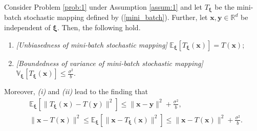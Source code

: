 \documentclass[10pt,a4paper]{amsart}
\begin{document}
\begin{proposition}\label{prop:1}
Consider Problem \ref{prob:1} under Assumption \ref{assum:1} and let $T_{\bm{\xi}}$ be the mini-batch stochastic mapping defined by (\ref{mini_batch}). Further, let $\bm{x}, \bm{y} \in \mathbb{R}^d$ be independent of $\bm{\xi}$. Then, the following hold.
\begin{enumerate}
\item[{\em (i)}] {\em [Unbiasedness of mini-batch stochastic mapping]} $\displaystyle{\mathbb{E}_{\bm{\xi}}[T_{\bm{\xi}}(\bm{x})] = T(\bm{x})}$;
\item[{\em (ii)}] {\em [Boundedness of variance of mini-batch stochastic mapping]} $\displaystyle{\mathbb{V}_{\bm{\xi}}[T_{\bm{\xi}} (\bm{x})] \leq \frac{\sigma^2}{b}}$.
\end{enumerate}
Moreover, {\em (i)} and {\em (ii)} lead to the finding that 
\begin{align}
&\mathbb{E}_{\bm{\xi}} \left[ \| T_{\bm{\xi}}(\bm{x}) - T(\bm{y}) \|^2 \right]
\leq 
\|\bm{x} - \bm{y} \|^2 
+ 
\frac{\sigma^2}{b}, \label{app_nonexp}\\
&
\|\bm{x} - T (\bm{x})\|^2
\leq
\mathbb{E}_{\bm{\xi}} \left[ \| \bm{x} - T_{\bm{\xi}}(\bm{x}) \|^2 \right] 
\leq \|\bm{x} - T (\bm{x})\|^2 + \frac{\sigma^2}{b}. \label{app_nonexp_1}
\end{align}
\end{proposition}
\end{document}
